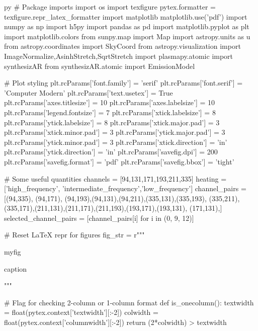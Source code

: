 \begin{pythontexcustomcode}{py}
# Package imports
import os
import texfigure
pytex.formatter = texfigure.repr_latex_formatter
import matplotlib
matplotlib.use('pdf')
import numpy as np
import h5py
import pandas as pd
import matplotlib.pyplot as plt
import matplotlib.colors
from sunpy.map import Map
import astropy.units as u
from astropy.coordinates import SkyCoord
from astropy.visualization import ImageNormalize,AsinhStretch,SqrtStretch
import plasmapy.atomic
import synthesizAR
from synthesizAR.atomic import EmissionModel

# Plot styling
plt.rcParams['font.family'] = 'serif'
plt.rcParams['font.serif'] = 'Computer Modern'
plt.rcParams['text.usetex'] = True
plt.rcParams['axes.titlesize'] = 10
plt.rcParams['axes.labelsize'] = 10
plt.rcParams['legend.fontsize'] = 7
plt.rcParams['xtick.labelsize'] = 8
plt.rcParams['ytick.labelsize'] = 8
plt.rcParams['xtick.major.pad'] = 3
plt.rcParams['xtick.minor.pad'] = 3
plt.rcParams['ytick.major.pad'] = 3
plt.rcParams['ytick.minor.pad'] = 3
plt.rcParams['xtick.direction'] = 'in'
plt.rcParams['ytick.direction'] = 'in'
plt.rcParams['savefig.dpi'] = 200
plt.rcParams['savefig.format'] = 'pdf'
plt.rcParams['savefig.bbox'] = 'tight'

# Some useful quantities
channels = [94,131,171,193,211,335]
heating = ['high_frequency', 'intermediate_frequency','low_frequency']
channel_pairs = [(94,335), (94,171), (94,193),(94,131),(94,211),(335,131),(335,193),
					(335,211),(335,171),(211,131),(211,171),(211,193),(193,171),(193,131),
					(171,131),]
selected_channel_pairs = [channel_pairs[i] for i in (0, 9, 12)]

# Reset LaTeX repr for figures
fig_str = r"""
\begin{{{figure_env_name}}}
	\centering
	{myfig}
	\caption{{{caption}}}
	\label{{{label}}}
\end{{{figure_env_name}}}
"""

# Flag for checking 2-column or 1-column format
def is_onecolumn():
	textwidth = float(pytex.context['textwidth'][:-2])
	colwidth = float(pytex.context['columnwidth'][:-2])
	return (2*colwidth) > textwidth
\end{pythontexcustomcode}